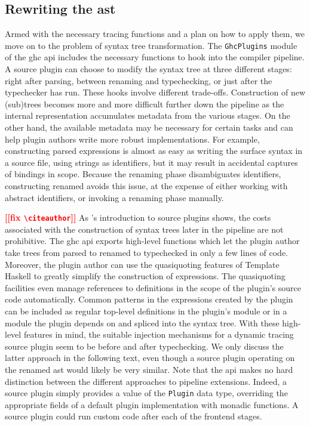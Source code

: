 \documentclass[thesis=B,english]{FITthesis}[2019/12/23]
\newcommand{\todo}[1]{\textcolor{red}{\textbf{[[#1]]}}}
\newcommand{\hsType}[1]{\texttt{#1}}
\newcommand{\hsModule}[1]{\texttt{#1}}
\begin{document}
\subsection*{Rewriting the \acrshort{ast}}
Armed with the necessary tracing functions and a plan on how to apply them, we
move on to the problem of syntax tree transformation. The \hsModule{GhcPlugins}
module\cite{hkg-ghcplugins} of the \acrshort{ghc} \acrshort{api} includes the
necessary functions to hook into the compiler pipeline. A source plugin can
choose to modify the syntax tree at three different stages: right after
parsing, between renaming and typechecking, or just after the typechecker has
run. These hooks involve different trade-offs. Construction of new (sub)trees
becomes more and more difficult further down the pipeline as the internal
representation accumulates metadata from the various stages. On the other hand,
the available metadata may be necessary for certain tasks and can help plugin
authors write more robust implementations. For example, constructing parsed
expressions is almost as easy as writing the surface syntax in a source file,
using strings as identifiers, but it may result in accidental captures of
bindings in scope. Because the renaming phase disambiguates identifiers,
constructing renamed  avoids this issue, at the expense of
either working with abstract identifiers, or invoking a renaming phase
manually.

\todo{fix \texttt{\textbackslash citeauthor}}
As \citeauthor{blog-source-plugins}'s introduction to source plugins shows, the
costs associated with the construction of syntax trees later in the pipeline
are not prohibitive\cite{blog-source-plugins}. The \acrshort{ghc}
\acrshort{api} exports high-level functions which let the plugin author take
trees from parsed to renamed to typechecked in only a few lines of code.
Moreover, the plugin author can use the quasi\-quoting
features\cite{th-quasiquoting} of Template Haskell\cite{th-classic} to greatly
simplify the construction of expressions. The quasi\-quoting facilities even
manage references to definitions in the scope of the plugin's source code
automatically. Common patterns in the expressions created by the plugin can be
included as regular top-level definitions in the plugin's module or in a module
the plugin depends on and spliced into the syntax tree. With these high-level
features in mind, the suitable injection mechanisms for a dynamic tracing
source plugin seem to be before and after typechecking. We only discuss the
latter approach in the following text, even though a source plugin operating on
the renamed \acrshort{ast} would likely be very similar. Note that the
\acrshort{api} makes no hard distinction between the different approaches to
pipeline extensions. Indeed, a source plugin simply provides a value of the
\hsType{Plugin} data type, overriding the appropriate fields of a default
plugin implementation with monadic functions. A source plugin could run custom
code after each of the frontend stages.
\end{document}
